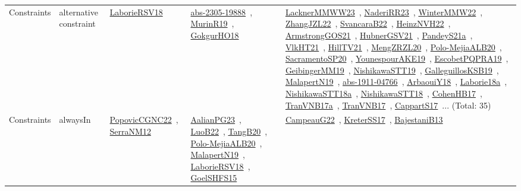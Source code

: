 {\begin{longtable}{lp{3cm}>{\raggedright\arraybackslash}p{6cm}>{\raggedright\arraybackslash}p{6cm}>{\raggedright\arraybackslash}p{8cm}}
Constraints & alternative constraint & \href{works/LaborieRSV18.pdf}{LaborieRSV18}~\cite{LaborieRSV18} & \href{works/abs-2305-19888.pdf}{abs-2305-19888}~\cite{abs-2305-19888}, \href{works/MurinR19.pdf}{MurinR19}~\cite{MurinR19}, \href{works/GokgurHO18.pdf}{GokgurHO18}~\cite{GokgurHO18} & \href{works/LacknerMMWW23.pdf}{LacknerMMWW23}~\cite{LacknerMMWW23}, \href{works/NaderiRR23.pdf}{NaderiRR23}~\cite{NaderiRR23}, \href{works/WinterMMW22.pdf}{WinterMMW22}~\cite{WinterMMW22}, \href{works/ZhangJZL22.pdf}{ZhangJZL22}~\cite{ZhangJZL22}, \href{works/SvancaraB22.pdf}{SvancaraB22}~\cite{SvancaraB22}, \href{works/HeinzNVH22.pdf}{HeinzNVH22}~\cite{HeinzNVH22}, \href{works/ArmstrongGOS21.pdf}{ArmstrongGOS21}~\cite{ArmstrongGOS21}, \href{works/HubnerGSV21.pdf}{HubnerGSV21}~\cite{HubnerGSV21}, \href{works/PandeyS21a.pdf}{PandeyS21a}~\cite{PandeyS21a}, \href{works/VlkHT21.pdf}{VlkHT21}~\cite{VlkHT21}, \href{works/HillTV21.pdf}{HillTV21}~\cite{HillTV21}, \href{works/MengZRZL20.pdf}{MengZRZL20}~\cite{MengZRZL20}, \href{works/Polo-MejiaALB20.pdf}{Polo-MejiaALB20}~\cite{Polo-MejiaALB20}, \href{works/SacramentoSP20.pdf}{SacramentoSP20}~\cite{SacramentoSP20}, \href{works/YounespourAKE19.pdf}{YounespourAKE19}~\cite{YounespourAKE19}, \href{works/EscobetPQPRA19.pdf}{EscobetPQPRA19}~\cite{EscobetPQPRA19}, \href{works/GeibingerMM19.pdf}{GeibingerMM19}~\cite{GeibingerMM19}, \href{works/NishikawaSTT19.pdf}{NishikawaSTT19}~\cite{NishikawaSTT19}, \href{works/GalleguillosKSB19.pdf}{GalleguillosKSB19}~\cite{GalleguillosKSB19}, \href{works/MalapertN19.pdf}{MalapertN19}~\cite{MalapertN19}, \href{works/abs-1911-04766.pdf}{abs-1911-04766}~\cite{abs-1911-04766}, \href{works/ArbaouiY18.pdf}{ArbaouiY18}~\cite{ArbaouiY18}, \href{works/Laborie18a.pdf}{Laborie18a}~\cite{Laborie18a}, \href{works/NishikawaSTT18a.pdf}{NishikawaSTT18a}~\cite{NishikawaSTT18a}, \href{works/NishikawaSTT18.pdf}{NishikawaSTT18}~\cite{NishikawaSTT18}, \href{works/CohenHB17.pdf}{CohenHB17}~\cite{CohenHB17}, \href{works/TranVNB17a.pdf}{TranVNB17a}~\cite{TranVNB17a}, \href{works/TranVNB17.pdf}{TranVNB17}~\cite{TranVNB17}, \href{works/CappartS17.pdf}{CappartS17}~\cite{CappartS17}... (Total: 35)\\
Constraints & alwaysIn & \href{works/PopovicCGNC22.pdf}{PopovicCGNC22}~\cite{PopovicCGNC22}, \href{works/SerraNM12.pdf}{SerraNM12}~\cite{SerraNM12} & \href{works/AalianPG23.pdf}{AalianPG23}~\cite{AalianPG23}, \href{works/LuoB22.pdf}{LuoB22}~\cite{LuoB22}, \href{works/TangB20.pdf}{TangB20}~\cite{TangB20}, \href{works/Polo-MejiaALB20.pdf}{Polo-MejiaALB20}~\cite{Polo-MejiaALB20}, \href{works/MalapertN19.pdf}{MalapertN19}~\cite{MalapertN19}, \href{works/LaborieRSV18.pdf}{LaborieRSV18}~\cite{LaborieRSV18}, \href{works/GoelSHFS15.pdf}{GoelSHFS15}~\cite{GoelSHFS15} & \href{works/CampeauG22.pdf}{CampeauG22}~\cite{CampeauG22}, \href{works/KreterSS17.pdf}{KreterSS17}~\cite{KreterSS17}, \href{works/BajestaniB13.pdf}{BajestaniB13}~\cite{BajestaniB13}\\

\end{longtable}}
